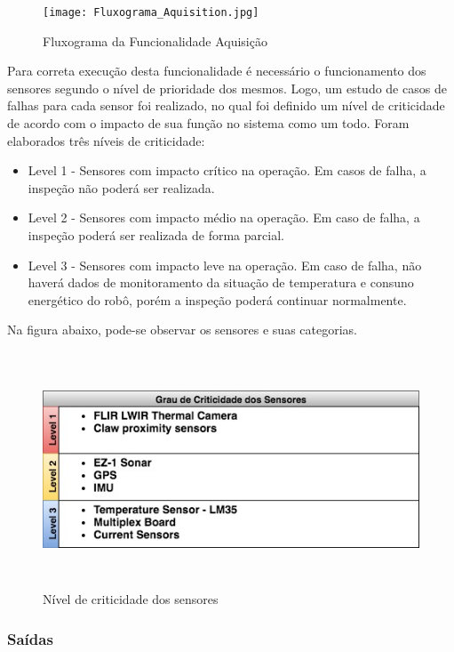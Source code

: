     \begin{figure}[!ht]
	\centering
	\texttt{[image: Fluxograma\_Aquisition.jpg]}
	\caption{Fluxograma da Funcionalidade Aquisição} \label{FuncAquisition}
	\end{figure}
	
      Para correta execução desta funcionalidade é necessário o funcionamento dos sensores segundo o nível de prioridade dos mesmos. Logo, um estudo de casos de falhas para cada sensor foi realizado, no qual foi definido um nível de criticidade de acordo com o impacto de sua função no sistema como um todo. Foram elaborados três níveis de criticidade:
     \begin{itemize}
     	\item Level 1 - Sensores com impacto crítico na operação. Em casos de falha, a inspeção não poderá ser realizada.
        \item Level 2 - Sensores com impacto médio na operação. Em caso de falha, a inspeção poderá ser realizada de forma parcial.
        \item Level 3 - Sensores com impacto leve na operação. Em caso de falha, não haverá dados de monitoramento da situação de temperatura e consuno energético do robô, porém a inspeção poderá continuar normalmente.
	\end{itemize}
	
	Na figura abaixo, pode-se observar os sensores e suas categorias.
	
	\begin{figure}[!ht]
	\centering
	\includegraphics[height=7cm, width=14cm]{Figures/criticidade.jpg}
	\caption{Nível de criticidade dos sensores} \label{FuncAquisition}
	\end{figure}
	
	\subsubsection{Saídas}
     
